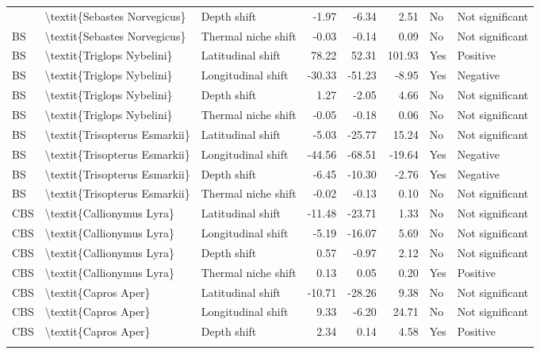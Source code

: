 \begin{longtable}[t]{lllrrrll}
{{BS & \textbackslash{}textit\{Sebastes Norvegicus\} & Depth shift & -1.97 & -6.34 & 2.51 & No & Not significant\\
BS & \textbackslash{}textit\{Sebastes Norvegicus\} & Thermal niche shift & -0.03 & -0.14 & 0.09 & No & Not significant\\
BS & \textbackslash{}textit\{Triglops Nybelini\} & Latitudinal shift & 78.22 & 52.31 & 101.93 & Yes & Positive\\
\addlinespace
BS & \textbackslash{}textit\{Triglops Nybelini\} & Longitudinal shift & -30.33 & -51.23 & -8.95 & Yes & Negative\\
BS & \textbackslash{}textit\{Triglops Nybelini\} & Depth shift & 1.27 & -2.05 & 4.66 & No & Not significant\\
BS & \textbackslash{}textit\{Triglops Nybelini\} & Thermal niche shift & -0.05 & -0.18 & 0.06 & No & Not significant\\
BS & \textbackslash{}textit\{Trisopterus Esmarkii\} & Latitudinal shift & -5.03 & -25.77 & 15.24 & No & Not significant\\
BS & \textbackslash{}textit\{Trisopterus Esmarkii\} & Longitudinal shift & -44.56 & -68.51 & -19.64 & Yes & Negative\\
\addlinespace
BS & \textbackslash{}textit\{Trisopterus Esmarkii\} & Depth shift & -6.45 & -10.30 & -2.76 & Yes & Negative\\
BS & \textbackslash{}textit\{Trisopterus Esmarkii\} & Thermal niche shift & -0.02 & -0.13 & 0.10 & No & Not significant\\
CBS & \textbackslash{}textit\{Callionymus Lyra\} & Latitudinal shift & -11.48 & -23.71 & 1.33 & No & Not significant\\
CBS & \textbackslash{}textit\{Callionymus Lyra\} & Longitudinal shift & -5.19 & -16.07 & 5.69 & No & Not significant\\
CBS & \textbackslash{}textit\{Callionymus Lyra\} & Depth shift & 0.57 & -0.97 & 2.12 & No & Not significant\\
\addlinespace
CBS & \textbackslash{}textit\{Callionymus Lyra\} & Thermal niche shift & 0.13 & 0.05 & 0.20 & Yes & Positive\\
CBS & \textbackslash{}textit\{Capros Aper\} & Latitudinal shift & -10.71 & -28.26 & 9.38 & No & Not significant\\
CBS & \textbackslash{}textit\{Capros Aper\} & Longitudinal shift & 9.33 & -6.20 & 24.71 & No & Not significant\\
CBS & \textbackslash{}textit\{Capros Aper\} & Depth shift & 2.34 & 0.14 & 4.58 & Yes & Positive\\
}}
\end{longtable}
